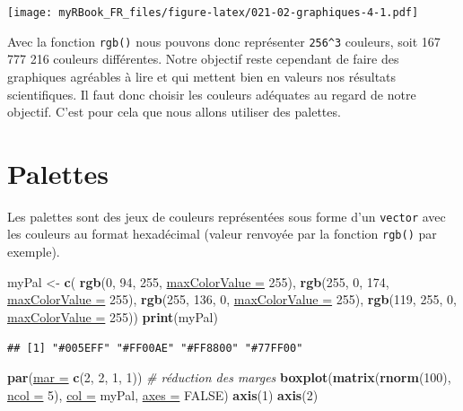 \documentclass[twoside,symmetric]{book}
\newenvironment{Shaded}{}{}
\newcommand{\CommentTok}[1]{\textit{#1}}
\newcommand{\DataTypeTok}[1]{\underline{#1}}
\newcommand{\DecValTok}[1]{#1}
\newcommand{\KeywordTok}[1]{\textbf{#1}}
\newcommand{\NormalTok}[1]{#1}
\newcommand{\OtherTok}[1]{#1}
\newcommand{\StringTok}[1]{#1}
\begin{document}
\texttt{[image: myRBook\_FR\_files/figure-latex/021-02-graphiques-4-1.pdf]}

Avec la fonction \texttt{rgb()} nous pouvons donc représenter \texttt{256\^{}3} couleurs, soit 167 777 216 couleurs différentes. Notre objectif reste cependant de faire des graphiques agréables à lire et qui mettent bien en valeurs nos résultats scientifiques. Il faut donc choisir les couleurs adéquates au regard de notre objectif. C'est pour cela que nous allons utiliser des palettes.

\hypertarget{palettes}{%
\section{Palettes}\label{palettes}}

Les palettes sont des jeux de couleurs représentées sous forme d'un \texttt{vector} avec les couleurs au format hexadécimal (valeur renvoyée par la fonction \texttt{rgb()} par exemple).

\begin{Shaded}
\begin{Highlighting}[]
\NormalTok{myPal <-}\StringTok{ }\KeywordTok{c}\NormalTok{(}
  \KeywordTok{rgb}\NormalTok{(}\DecValTok{0}\NormalTok{, }\DecValTok{94}\NormalTok{, }\DecValTok{255}\NormalTok{, }\DataTypeTok{maxColorValue =} \DecValTok{255}\NormalTok{),  }
  \KeywordTok{rgb}\NormalTok{(}\DecValTok{255}\NormalTok{, }\DecValTok{0}\NormalTok{, }\DecValTok{174}\NormalTok{, }\DataTypeTok{maxColorValue =} \DecValTok{255}\NormalTok{),  }
  \KeywordTok{rgb}\NormalTok{(}\DecValTok{255}\NormalTok{, }\DecValTok{136}\NormalTok{, }\DecValTok{0}\NormalTok{, }\DataTypeTok{maxColorValue =} \DecValTok{255}\NormalTok{),  }
  \KeywordTok{rgb}\NormalTok{(}\DecValTok{119}\NormalTok{, }\DecValTok{255}\NormalTok{, }\DecValTok{0}\NormalTok{, }\DataTypeTok{maxColorValue =} \DecValTok{255}\NormalTok{))}
\KeywordTok{print}\NormalTok{(myPal)}
\end{Highlighting}
\end{Shaded}

\begin{verbatim}
## [1] "#005EFF" "#FF00AE" "#FF8800" "#77FF00"
\end{verbatim}

\begin{Shaded}
\begin{Highlighting}[]
\KeywordTok{par}\NormalTok{(}\DataTypeTok{mar =} \KeywordTok{c}\NormalTok{(}\DecValTok{2}\NormalTok{, }\DecValTok{2}\NormalTok{, }\DecValTok{1}\NormalTok{, }\DecValTok{1}\NormalTok{)) }\CommentTok{# réduction des marges}
\KeywordTok{boxplot}\NormalTok{(}\KeywordTok{matrix}\NormalTok{(}\KeywordTok{rnorm}\NormalTok{(}\DecValTok{100}\NormalTok{), }\DataTypeTok{ncol =} \DecValTok{5}\NormalTok{), }\DataTypeTok{col =}\NormalTok{ myPal, }\DataTypeTok{axes =} \OtherTok{FALSE}\NormalTok{)}
\KeywordTok{axis}\NormalTok{(}\DecValTok{1}\NormalTok{)}
\KeywordTok{axis}\NormalTok{(}\DecValTok{2}\NormalTok{)}
\end{Highlighting}
\end{Shaded}
\end{document}
